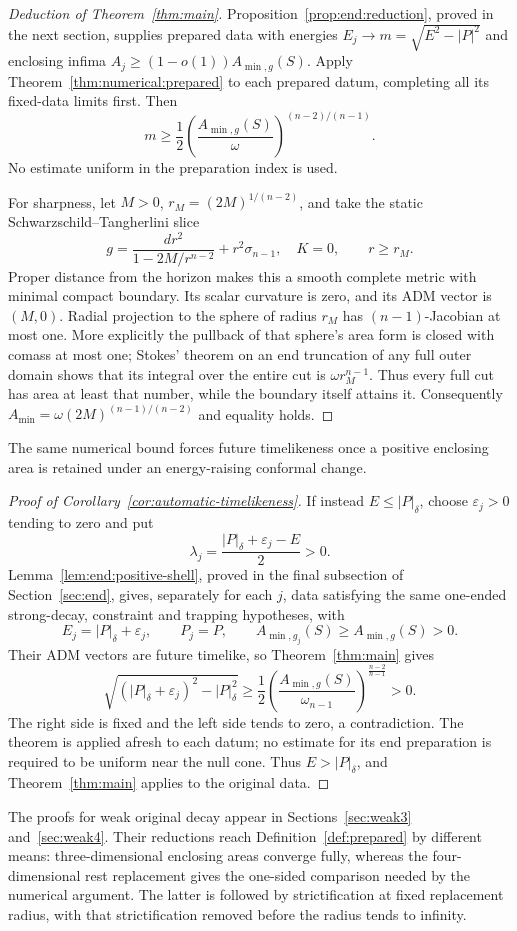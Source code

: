 \begin{proof}[Deduction of Theorem~\ref{thm:main}]
Proposition~\ref{prop:end:reduction}, proved in the next section,
supplies prepared data with energies $E_j\to
m=\sqrt{E^2-|P|^2}$ and enclosing infima
$A_j\ge(1-o(1))A_{\min,g}(S)$. Apply
Theorem~\ref{thm:numerical:prepared} to each prepared datum,
completing all its fixed-data limits first. Then
\[
 m\ge\frac12\left(\frac{A_{\min,g}(S)}\omega\right)^{(n-2)/(n-1)}.
\]
No estimate uniform in the preparation index is used.

For sharpness, let $M>0$, $r_M=(2M)^{1/(n-2)}$, and take the static
Schwarzschild--Tangherlini slice
\[
 g=\frac{dr^2}{1-2M/r^{n-2}}+r^2\sigma_{n-1},\quad K=0,
 \qquad r\ge r_M.
\]
Proper distance from the horizon makes this a smooth complete metric
with minimal compact boundary. Its scalar curvature is zero, and its
ADM vector is $(M,0)$. Radial projection to the sphere of radius $r_M$
has $(n-1)$-Jacobian at most one. More explicitly the pullback of that
sphere's area form is closed with comass at most one; Stokes' theorem
on an end truncation of any full outer domain shows that its integral
over the entire cut is $\omega r_M^{n-1}$. Thus every full cut has area
at least that number, while the boundary itself attains it. Consequently
$A_{\min}=\omega(2M)^{(n-1)/(n-2)}$ and equality holds.
\end{proof}

The same numerical bound forces future timelikeness once a positive
enclosing area is retained under an energy-raising conformal change.

\begin{proof}[Proof of Corollary~\ref{cor:automatic-timelikeness}]
If instead $E\le |P|_\delta$, choose $\varepsilon_j>0$ tending to zero
and put
\[
 \lambda_j=\frac{|P|_\delta+\varepsilon_j-E}{2}>0.
\]
Lemma~\ref{lem:end:positive-shell}, proved in the final subsection
of Section~\ref{sec:end}, gives, separately for each $j$,
data satisfying the same one-ended strong-decay, constraint and trapping
hypotheses, with
\[
 E_j=|P|_\delta+\varepsilon_j,\qquad P_j=P,\qquad
 A_{\min,g_j}(S)\ge A_{\min,g}(S)>0.
\]
Their ADM vectors are future timelike, so Theorem~\ref{thm:main} gives
\[
 \sqrt{(|P|_\delta+\varepsilon_j)^2-|P|_\delta^2}
 \ge \frac12\left(\frac{A_{\min,g}(S)}{\omega_{n-1}}\right)^{
                   \frac{n-2}{n-1}}>0.
\]
The right side is fixed and the left side tends to zero, a contradiction.
The theorem is applied afresh to each datum; no estimate for its
end preparation is required to be uniform near the null cone.
Thus $E>|P|_\delta$, and Theorem~\ref{thm:main} applies to the original data.
\end{proof}

The proofs for weak original decay appear in Sections~\ref{sec:weak3}
and~\ref{sec:weak4}. Their reductions reach Definition~\ref{def:prepared}
by different means: three-dimensional enclosing areas converge fully,
whereas the four-dimensional rest replacement gives the one-sided
comparison needed by the numerical argument. The latter is followed by
strictification at fixed replacement radius, with that strictification
removed before the radius tends to infinity.
